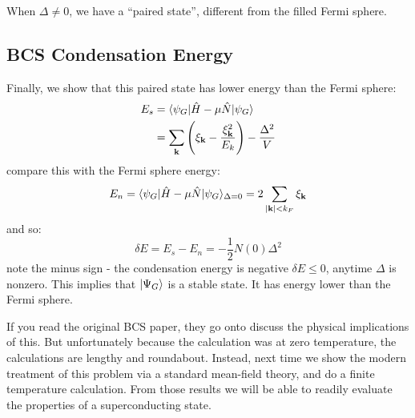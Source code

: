 When $\Delta \neq 0$, we have a ``paired state'', different from the filled Fermi sphere.

\subsection{BCS Condensation Energy}
Finally, we show that this paired state has lower energy than the Fermi sphere:
\begin{equation}
    \begin{split}
        E_s &= \langle \psi_G \rvert\hat{H} - \mu\hat{N}\lvert \psi_G \rangle
        \\ &= \sum_{\mathbf{k}}\left(\xi_{\mathbf{k}} - \frac{\xi_{\mathbf{k}}^2}{E_k}\right) - \frac{\Delta^2}{V}
    \end{split}
\end{equation}
compare this with the Fermi sphere energy:
\begin{equation}
    E_n = \langle \psi_G \rvert\hat{H} - \mu\hat{N}\lvert \psi_G \rangle_{\Delta = 0} = 2\sum_{\lvert \mathbf{k} \rvert < k_F} \xi_{\mathbf{k}}
\end{equation}
and so:
\begin{equation}
    \boxed{\delta E = E_s - E_n = -\frac{1}{2}N(0)\Delta^2}
\end{equation}
note the minus sign - the condensation energy is negative $\delta E \leq 0$, anytime $\Delta$ is nonzero. This implies that $\lvert \Psi_G \rangle$ is a stable state. It has energy lower than the Fermi sphere.

If you read the original BCS paper, they go onto discuss the physical implications of this. But unfortunately because the calculation was at zero temperature, the calculations are lengthy and roundabout. Instead, next time we show the modern treatment of this problem via a standard mean-field theory, and do a finite temperature calculation. From those results we will be able to readily evaluate the properties of a superconducting state.